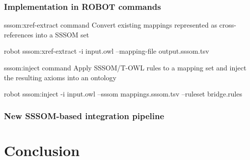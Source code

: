 \begin{frame}
  \frametitle{Implementation in ROBOT commands}

  \begin{block}{sssom:xref-extract command}
    Convert existing mappings represented as cross-references into a SSSOM set

    \medskip
    {\ttfamily\scriptsize
robot sssom:xref-extract -i input.owl --mapping-file output.sssom.tsv
    }
  \end{block}

  \begin{block}{sssom:inject command}
    Apply SSSOM/T-OWL rules to a mapping set and inject the resulting axioms into an ontology

    \medskip
    {\ttfamily\scriptsize
robot sssom:inject -i input.owl --sssom mappings.sssom.tsv --ruleset bridge.rules
    }
  \end{block}
\end{frame}

\begin{frame}
  \frametitle{New SSSOM-based integration pipeline}

  \begin{center}
  \end{center}
\end{frame}

\section{Conclusion}

